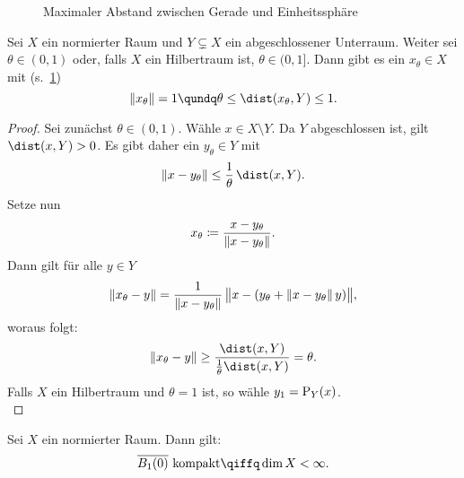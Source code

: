 \begin{thSatz} \label{vl16:fastorthogonaleselem}
    \begin{figure}[b]
        \centering
        \caption{Maximaler Abstand zwischen Gerade und Einheitssphäre}
        \label{fig:fastorthog}
    \end{figure}
    Sei $X$ ein normierter Raum und $Y\subsetneq X$ ein abgeschlossener Unterraum.
    Weiter sei $\theta\in(0,1)$ oder, falls $X$ ein Hilbertraum ist,
    $\theta\in(0,1]$. Dann gibt es ein $x_\theta\in X$ mit
    (s.~\cref{fig:fastorthog})
    \[ \norm{x_\theta} = 1 \qundq \theta\leq\dist(x_\theta,Y)\leq 1   . \]
\end{thSatz}

\begin{proof}
    Sei zunächst $\theta\in(0,1)$.
    Wähle $x\in X\setminus Y$. Da $Y$ abgeschlossen ist, gilt $\dist(x,Y)>0$. Es
    gibt daher ein $y_\theta\in Y$ mit
    \[ \norm{x-y_\theta} \leq \frac{1}{\theta} \, \dist(x,Y)  . \]
    Setze nun
    \[ x_\theta \defeq \frac{x-y_\theta}{\norm{x-y_\theta}}  . \]
    Dann gilt für alle $y\in Y$
    \[ \norm{x_\theta-y} = \frac{1}{\norm{x-y_\theta}} \,
        \norm[\big]{x-(y_\theta+\norm{x-y_\theta}\,y)}
    , \]
    woraus folgt:
    \[ \norm{x_\theta-y} 
        \geq \frac{\dist(x,Y)}{\frac{1}{\theta}\dist(x,Y)} =
        \theta
    . \]
    Falls $X$ ein Hilbertraum und $\theta=1$ ist, so wähle $y_1=\Proj_Y(x)$.
    \\
\end{proof}

\begin{thSatz} \label{vl16:heineborel}
    Sei $X$ ein normierter Raum. Dann gilt:
    \[ \setclosure{B_1(0)} \text{ kompakt} \qiffq \dim X < \infty  . \]
\end{thSatz}

